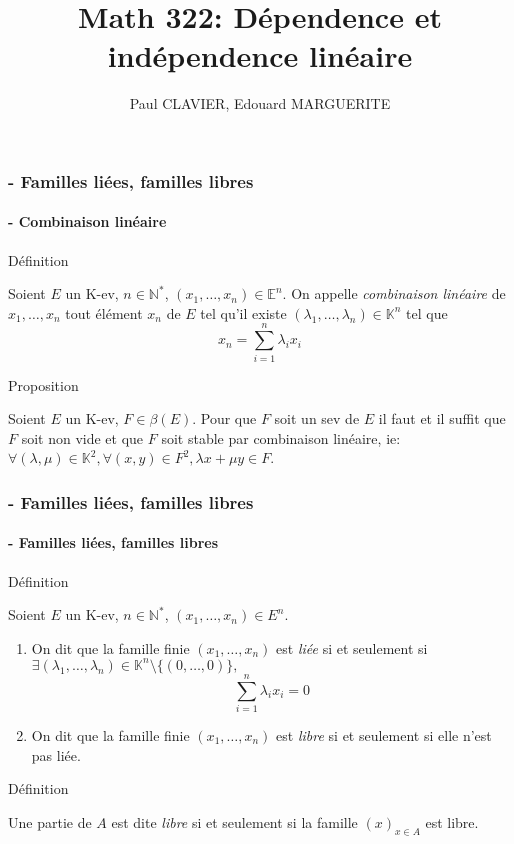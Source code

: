 \documentclass[10pt,a4paper]{beamer}
\author{Paul CLAVIER, Edouard MARGUERITE}
\title{Math 322: Dépendence et indépendence linéaire}
\newcounter{Def}
\newcounter{Pro}
\newcounter{Sec}
\newcounter{Sub}[Sec]
\begin{document}
\maketitle

\begin{frame}
\frametitle{ - Familles liées, familles libres}
\framesubtitle{\theSub - Combinaison linéaire}

\begin{block}{Définition \theDef}
\addtocounter{Def}{1}
Soient $E$ un K-ev, $n\in\mathbb{N^*}$, $(x_1,\ldots,x_n)\in\mathbb{E}^n$. On appelle \emph{combinaison linéaire} de $x_1,\ldots,x_n$ tout élément $x_n$ de $E$ tel qu'il existe $(\lambda_1,\ldots,\lambda_n)\in\mathbb{K}^n$ tel que \[ x_n=\sum_{i=1}^n \lambda_ix_i \]
\end{block}

\begin{block}{Proposition \thePro}
\addtocounter{Pro}{1}
Soient $E$ un K-ev, $F\in\beta (E)$. Pour que $F$ soit un sev de $E$ il faut et il suffit que $F$ soit non vide et que $F$ soit stable par combinaison linéaire, ie: $\forall (\lambda,\mu)\in\mathbb{K}^2, \forall (x,y)\in F^2, \lambda x+\mu y\in F$.
\end{block}
\end{frame}

\addtocounter{Sub}{1}

\begin{frame}
\frametitle{ - Familles liées, familles libres}
\framesubtitle{\theSub - Familles liées, familles libres}

\begin{block}{Définition \theDef}
\addtocounter{Def}{1}
Soient $E$ un K-ev, $n\in\mathbb{N}^*$, $(x_1,\ldots,x_n)\in E^n$.\begin{enumerate}
\item On dit que la famille finie $(x_1,\ldots,x_n)$ est \emph{liée} si et seulement si $\exists (\lambda_1,\ldots,\lambda_n)\in\mathbb{K}^n\setminus\lbrace(0,\ldots,0)\rbrace,$ \[ \sum_{i=1}^{n}\lambda_ix_i = 0 \]
\item On dit que la famille finie $(x_1,\ldots,x_n)$ est \emph{libre} si et seulement si elle n'est pas liée.
\end{enumerate}
\end{block}

\begin{block}{Définition \theDef}
\addtocounter{Def}{1}
Une partie de $A$ est dite \emph{libre} si et seulement si la famille $(x)_{x\in A}$ est libre.
\end{block}
\end{frame}
\end{document}
